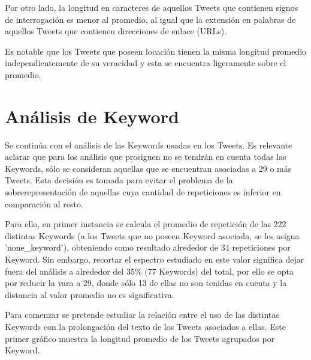 \documentclass[titlepage,a4paper]{article}
\begin{document}
    Por otro lado, la longitud en caracteres de aquellos Tweets que contienen signos de interrogación es menor al promedio, al igual que la extensión en palabras de aquellos Tweets que contienen direcciones de enlace (URLs). 
    
    Es notable que los Tweets que poseen locación tienen la misma longitud promedio independientemente de su veracidad y esta se encuentra ligeramente sobre el promedio.  
    
    \newpage
    \section{Análisis de Keyword}\label{sec:intro}

    Se continúa con el análisis de las Keywords usadas en los Tweets. Es relevante aclarar que para los análisis que prosiguen no se tendrán en cuenta todas las Keywords, sólo se consideran aquellas que se encuentran asociadas a 29 o más Tweets. Esta decisión es tomada para evitar el problema de la sobrerepresentación de aquellas cuya cantidad de repeticiones es inferior en comparación al resto. 
    
    Para ello, en primer instancia se calcula el promedio de repetición de las 222 distintas Keywords (a los Tweets que no poseen Keyword asociada, se les asigna 'none\_keyword'), obteniendo como resultado alrededor de 34 repeticiones por Keyword. Sin embargo, recortar el espectro estudiado en este valor significa dejar fuera del análisis a alrededor del 35\% (77 Keywords) del total, por ello se opta por reducir la vara a 29, donde sólo 13 de ellas no son tenidas en cuenta y la distancia al valor promedio no es significativa. 
    
    Para comenzar se pretende estudiar la relación entre el uso de las distintas Keywords con la prolongación del texto de los Tweets asociados a ellas. Este primer gráfico muestra la longitud promedio de los Tweets agrupados por Keyword. 
\end{document}
